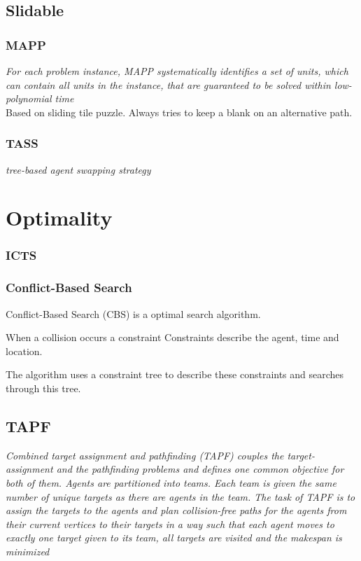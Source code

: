 \documentclass[a4paper,11pt]{article}
\begin{document}
\subsection{Slidable}
\subsubsection*{MAPP}
\cite{wang2011mapp}

\textit{For each problem instance, MAPP systematically identifies a set of units, which can contain all units in the instance, that are guaranteed to be solved within low-polynomial time} \\

Based on sliding tile puzzle. Always tries to keep a blank on an alternative path.

\subsubsection*{TASS}
\textit{tree-based agent swapping strategy}

\section{Optimality}

\subsubsection{ICTS}

\subsubsection{Conflict-Based Search}
Conflict-Based Search (CBS) is a optimal search algorithm.

When a collision occurs a constraint 
Constraints describe the agent, time and location.

The algorithm uses a constraint tree to describe these constraints and searches through this tree.


\subsection{TAPF}

\textit{Combined target assignment and pathfinding (TAPF) couples the target-assignment and the pathfinding problems and defines one common objective for both of them. Agents are partitioned into teams.
Each team is given the same number of unique targets as there are agents in the team. The task of TAPF is to assign the targets to the agents and plan collision-free paths for the agents from their current vertices to their targets in a way such that each agent moves to exactly one target given to its team, all targets are visited and the makespan is minimized}
\end{document}

